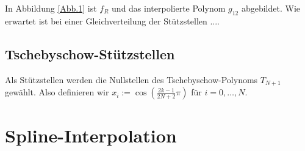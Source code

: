 \documentclass[]{scrartcl}
\begin{document}
	In Abbildung \ref{Abb.1} ist $f_R$ und das interpolierte Polynom $g_{12}$ abgebildet. Wie erwartet ist bei einer Gleichverteilung der Stützstellen ....
	\subsection{Tschebyschow-Stützstellen}
	Als Stützstellen werden die Nullstellen des Tschebyschow-Polynoms $T_{N+1}$ gewählt. Also definieren wir $x_i:=\cos(\frac{2k-1}{2N+2}\pi)$ für $i=0,\dots,N$.
	\section{Spline-Interpolation}
\end{document}
